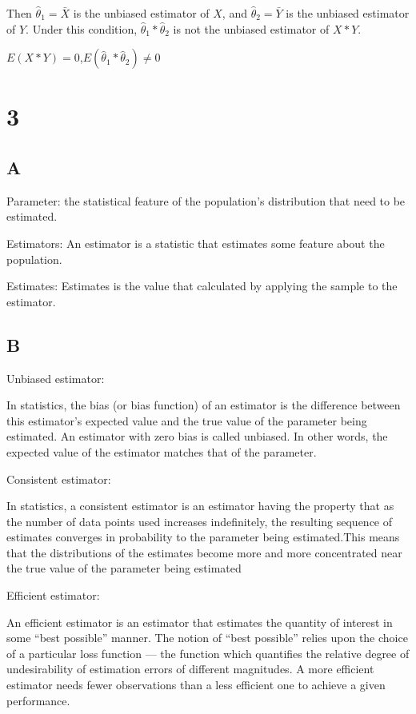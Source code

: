 \documentclass{article}
\begin{document}
	Then $\hat{\theta}_1=\bar{X}$ is the unbiased estimator of $X$, and $\hat{\theta}_2=\bar{Y}$ is the unbiased estimator of $Y$.
	Under this condition, $\hat{\theta}_1*\hat{\theta}_2$ is not the unbiased estimator of $X*Y$.
	
	$E(X*Y)=0$,$E(\hat{\theta}_1*\hat{\theta}_2)\ne 0$
	
	
	\section*{3}
	
	\subsection*{A}
	Parameter: the statistical feature of the population's distribution that need to be estimated.
	
	Estimators: An estimator is a statistic that estimates some feature about the population.
	
	Estimates: Estimates is the value that calculated by applying the sample to the estimator. 
		
	\subsection*{B}
	
	Unbiased estimator:
	
	In statistics, the bias (or bias function) of an estimator is the difference between this estimator's expected value and the true value of the parameter being estimated. An estimator with zero bias is called unbiased. In other words, the expected value of the estimator matches that of the parameter.
	
	Consistent estimator:
	
	In statistics, a consistent estimator is an estimator having the property that as the number of data points used increases indefinitely, the resulting sequence of estimates converges in probability to the parameter being estimated.This means that the distributions of the estimates become more and more concentrated near the true value of the parameter being estimated
	
	Efficient estimator:
	
	An efficient estimator is an estimator that estimates the quantity of interest in some “best possible” manner. The notion of “best possible” relies upon the choice of a particular loss function — the function which quantifies the relative degree of undesirability of estimation errors of different magnitudes. A more efficient estimator needs fewer observations than a less efficient one to achieve a given performance.
	
\end{document}
